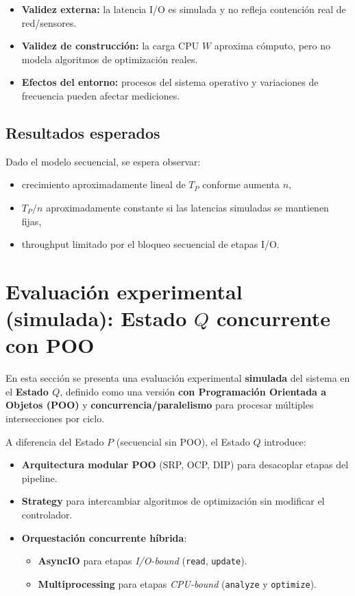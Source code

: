 \documentclass[12pt]{article}
\begin{document}
\begin{itemize}
\item \textbf{Validez externa:} la latencia I/O es simulada y no refleja contención real de red/sensores.
\item \textbf{Validez de construcción:} la carga CPU \(W\) aproxima cómputo, pero no modela algoritmos de optimización reales.
\item \textbf{Efectos del entorno:} procesos del sistema operativo y variaciones de frecuencia pueden afectar mediciones.
\end{itemize}

\subsection{Resultados esperados}

Dado el modelo secuencial, se espera observar:

\begin{itemize}
\item crecimiento aproximadamente lineal de \(T_P\) conforme aumenta \(n\),
\item \(T_P/n\) aproximadamente constante si las latencias simuladas se mantienen fijas,
\item throughput limitado por el bloqueo secuencial de etapas I/O.
\end{itemize}

\section{Evaluación experimental (simulada): Estado \(Q\) concurrente con POO}

En esta sección se presenta una evaluación experimental \textbf{simulada} del sistema en el \textbf{Estado \(Q\)},
definido como una versión \textbf{con Programación Orientada a Objetos (POO)} y \textbf{concurrencia/paralelismo}
para procesar múltiples intersecciones por ciclo.

A diferencia del Estado \(P\) (secuencial sin POO), el Estado \(Q\) introduce:

\begin{itemize}
\item \textbf{Arquitectura modular POO} (SRP, OCP, DIP) para desacoplar etapas del pipeline.
\item \textbf{Strategy} para intercambiar algoritmos de optimización sin modificar el controlador.
\item \textbf{Orquestación concurrente híbrida}:
  \begin{itemize}
    \item \textbf{AsyncIO} para etapas \textit{I/O-bound} (\texttt{read}, \texttt{update}).
    \item \textbf{Multiprocessing} para etapas \textit{CPU-bound} (\texttt{analyze} y \texttt{optimize}).
  \end{itemize}
\end{itemize}
\end{document}
